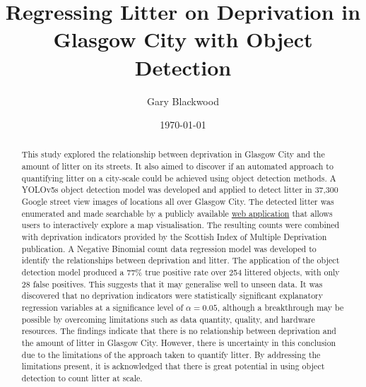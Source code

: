 \documentclass{thesis}
\begin{document}

\title{Regressing Litter on Deprivation in Glasgow City with Object Detection}
\author{Gary Blackwood}
\date{\today}
\maketitle


\begin{abstract}

This study explored the relationship between deprivation in Glasgow City and the amount of litter on its streets. It also aimed to discover if an automated approach to quantifying litter on a city-scale could be achieved using object detection methods. A YOLOv5s object detection model was developed and applied to detect litter in 37,300 Google street view images of locations all over Glasgow City. The detected litter was enumerated and made searchable by a publicly available \href{https://glasgow-litter.garyblackwood.co.uk}{web application} that allows users to interactively explore a map visualisation. The resulting counts were combined with deprivation indicators provided by the Scottish Index of Multiple Deprivation publication. A Negative Binomial count data regression model was developed to identify the relationships between deprivation and litter. The application of the object detection model produced a 77\% true positive rate over 254 littered objects, with only 28 false positives. This suggests that it may generalise well to unseen data. It was discovered that no deprivation indicators were statistically significant explanatory regression variables at a significance level of $\alpha = 0.05$, although a breakthrough may be possible by overcoming limitations such as data quantity, quality, and hardware resources. The findings indicate that there is no relationship between deprivation and the amount of litter in Glasgow City. However, there is uncertainty in this conclusion due to the limitations of the approach taken to quantify litter. By addressing the limitations present, it is acknowledged that there is great potential in using object detection to count litter at scale.

\end{abstract}

\end{document}
